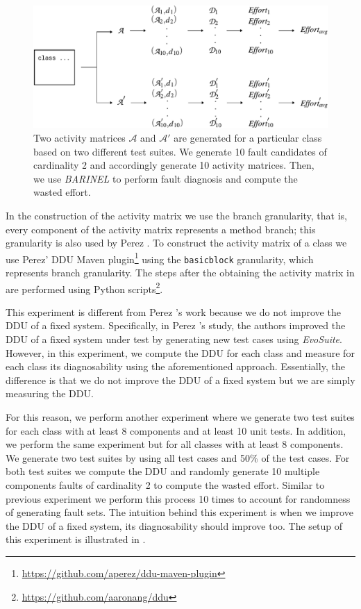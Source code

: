 \documentclass[twoside,a4paper,11pt]{memoir}
\begin{document}
\begin{figure}
  \includegraphics[width=\linewidth]{figures/delta_effort_approach}
  \caption{Two activity matrices $\mathcal{A}$ and $\mathcal{A}'$ are generated for a particular class based on two different test suites. We generate 10 fault candidates of cardinality 2 and accordingly generate 10 activity matrices. Then, we use \emph{BARINEL} to perform fault diagnosis and compute the wasted effort.}
  \label{fig:fault_generation_delta}
\end{figure}

In the construction of the activity matrix we use the branch granularity, that is, every component of the activity matrix represents a method branch; this granularity is also used by Perez \etal \cite{DBLP:conf/icse/PerezAD17}.
To construct the activity matrix of a class we use Perez' DDU Maven plugin\footnote{\url{https://github.com/aperez/ddu-maven-plugin}} using the \texttt{basicblock} granularity, which represents branch granularity.
The steps after the obtaining the activity matrix in  are performed using Python scripts\footnote{\url{https://github.com/aaronang/ddu}}.

This experiment is different from Perez \etal's work because we do not improve the DDU of a fixed system.
Specifically, in Perez \etal's study, the authors improved the DDU of a fixed system under test by generating new test cases using \emph{EvoSuite}.
However, in this experiment, we compute the DDU for each class and measure for each class its diagnosability using the aforementioned approach.
Essentially, the difference is that we do not improve the DDU of a fixed system but we are simply measuring the DDU.



For this reason, we perform another experiment where we generate two test suites for each class with at least 8 components and at least 10 unit tests.
In addition, we perform the same experiment but for all classes with at least 8 components.
We generate two test suites by using all test cases and 50\% of the test cases.
For both test suites we compute the DDU and randomly generate 10 multiple components faults of cardinality 2 to compute the wasted effort.
Similar to previous experiment we perform this process 10 times to account for randomness of generating fault sets.
The intuition behind this experiment is when we improve the DDU of a fixed system, its diagnosability should improve too.
The setup of this experiment is illustrated in .
\end{document}
